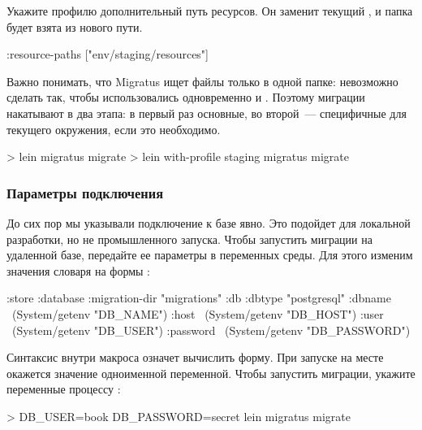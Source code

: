 Укажите профилю  дополнительный путь ресурсов. Он заменит текущий , и папка  будет взята из нового пути.

\begin{english}
  \begin{clojure}
{:resource-paths ["env/staging/resources"]}
  \end{clojure}
\end{english}

Важно понимать, что Migratus ищет файлы только в одной папке: невозможно сделать так, чтобы использовались одновременно  и . Поэтому миграции накатывают в два этапа: в первый раз основные, во второй~--- специфичные для текущего окружения, если это необходимо.

\begin{english}
  \begin{bash}
> lein migratus migrate
> lein with-profile staging migratus migrate
  \end{bash}
\end{english}

\subsubsection{Параметры подключения}

До сих пор мы указывали подключение к базе явно. Это подойдет для локальной разработки, но не промышленного запуска. Чтобы запустить миграции на удаленной базе, передайте ее параметры в переменных среды. Для этого изменим значения словаря  на формы :

\begin{english}
  \begin{clojure}
{:store :database
 :migration-dir "migrations"
 :db {:dbtype "postgresql"
      :dbname ~(System/getenv "DB_NAME")
      :host ~(System/getenv "DB_HOST")
      :user ~(System/getenv "DB_USER")
      :password ~(System/getenv "DB_PASSWORD")}}
  \end{clojure}
\end{english}

Синтаксис  внутри макроса  означет вычислить форму. При запуске  на месте  окажется значение одноименной переменной. Чтобы запустить миграции, укажите переменные процессу :

\begin{english}
  \begin{bash}
> DB_USER=book DB_PASSWORD=secret lein migratus migrate
  \end{bash}
\end{english}

